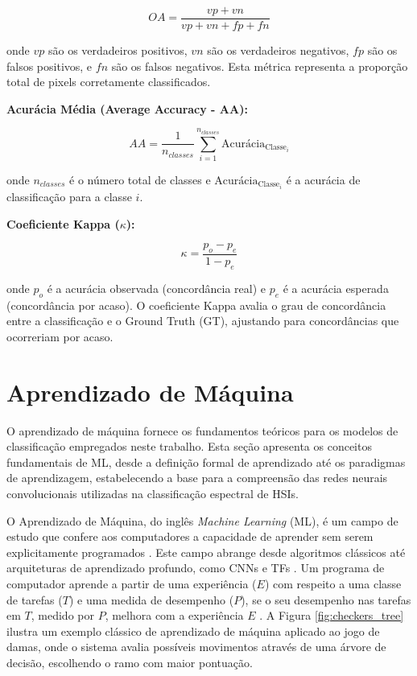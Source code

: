\begin{equation}
OA = \frac{vp + vn}{vp + vn + fp + fn}
\end{equation}

\noindent onde $vp$ são os verdadeiros positivos, $vn$ são os verdadeiros negativos, $fp$ são os falsos positivos, e $fn$ são os falsos negativos. Esta métrica representa a proporção total de pixels corretamente classificados.

\textbf{Acurácia Média (Average Accuracy - AA):}

\begin{equation}
AA = \frac{1}{n_{classes}} \sum_{i=1}^{n_{classes}} \text{Acurácia}_{\text{Classe}_i}
\end{equation}

\noindent onde $n_{classes}$ é o número total de classes e $\text{Acurácia}_{\text{Classe}_i}$ é a acurácia de classificação para a classe $i$.

\textbf{Coeficiente Kappa ($\kappa$):}

\begin{equation}
\kappa = \frac{p_o - p_e}{1 - p_e}
\end{equation}

\noindent onde $p_o$ é a acurácia observada (concordância real) e $p_e$ é a acurácia esperada (concordância por acaso). O coeficiente Kappa avalia o grau de concordância entre a classificação e o Ground Truth (GT), ajustando para concordâncias que ocorreriam por acaso.

\section{Aprendizado de Máquina}

O aprendizado de máquina fornece os fundamentos teóricos para os modelos de classificação empregados neste trabalho. Esta seção apresenta os conceitos fundamentais de ML, desde a definição formal de aprendizado até os paradigmas de aprendizagem, estabelecendo a base para a compreensão das redes neurais convolucionais utilizadas na classificação espectral de HSIs.

O Aprendizado de Máquina, do inglês \textit{Machine Learning} (ML), é um campo de estudo que confere aos computadores a capacidade de aprender sem serem explicitamente programados \cite{SomeStudiesinMachineLearningUsingtheGameofCheckers}. Este campo abrange desde algoritmos clássicos até arquiteturas de aprendizado profundo, como CNNs e TFs \cite{DeeplearningLC}. Um programa de computador aprende a partir de uma experiência ($E$) com respeito a uma classe de tarefas ($T$) e uma medida de desempenho ($P$), se o seu desempenho nas tarefas em $T$, medido por $P$, melhora com a experiência $E$ \cite{MachineLearning}. A Figura \ref{fig:checkers_tree} ilustra um exemplo clássico de aprendizado de máquina aplicado ao jogo de damas, onde o sistema avalia possíveis movimentos através de uma árvore de decisão, escolhendo o ramo com maior pontuação.

